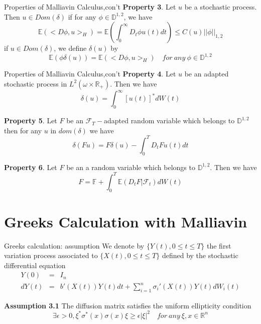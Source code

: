 \documentclass{beamer}
\begin{document}
\begin{frame}{Properties of Malliavin Calculus,con't}
\textbf{Property 3}. Let $u$ be a stochastic process. Then $u\in Dom(\delta)$ if for any $\phi\in \mathbb{D}^{1,2}$, we have
$$
\mathbb{E}(<D\phi,u>_H) = \mathbb{E} \left( \int_0^\infty D_t \phi u(t) dt \right) \leq C(u) ||\phi||_{1,2}
$$
if $u\in Dom(\delta)$, we define $\delta(u)$ by
$$
\mathbb{E}(\phi\delta(u)) = \mathbb{E}(<D\phi,u>_H) \quad for~any~\phi \in \mathbb{D}^{1,2}
$$
\end{frame}

\begin{frame}{Properties of Malliavin Calculus,con't}
\textbf{Property 4}. Let $u$ be an adapted stochastic process in $L^2(\omega \times \mathbb{R}_+)$. Then we have
$$
\delta(u) = \int_0^\infty [u(t)]^* dW(t)
$$

\textbf{Property 5}. Let $F$ be an $\mathcal{F}_T-$adapted random variable which belongs to $\mathbb{D}^{1,2}$ then for any $u$ in $dom(\delta)$ we have
$$
\delta(Fu) = F\delta(u) - \int_0^T D_t F u(t) dt
$$

\textbf{Property 6}. Let $F$ be an a random variable which belongs to $\mathbb{D}^{1,2}$. Then we have
$$
F = \mathbb{F} + \int_0^T \mathbb{E}(D_tF|\mathcal{F}_t) dW(t)
$$
\end{frame}



\section{Greeks Calculation with Malliavin}

\begin{frame}{Greeks calculation: assumption}
We denote by $\{Y(t), 0 \leq t \leq T\}$ the first variation process associated to $\{X(t), 0 \leq t \leq T\}$ defined by the stochastic differential equation
\begin{eqnarray*}
Y(0)  &=& I_n \\
dY(t) &=& b'(X(t))Y(t)dt + \sum_{i=1}^n \sigma_i'(X(t)) Y(t) dW_i(t)
\end{eqnarray*}

\textbf{Assumption 3.1} The diffusion matrix  satisfies the uniform ellipticity condition
$$
\exists \epsilon >0, \xi^* \sigma^*(x)\sigma(x)\xi \geq \epsilon |\xi|^2 \quad for~any~\xi,x \in \mathbb{R}^n
$$
\end{frame}
\end{document}
